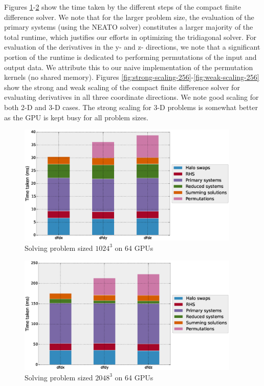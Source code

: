 \documentclass{elsarticle}
\begin{document}
Figures \ref{fig:compact-profiling-1024-64}-\ref{fig:compact-profiling-2048-64}
show the time taken by the different steps of
the compact finite difference solver.
We note that for the larger problem size,
the evaluation of the primary systems (using the NEATO solver)
constitutes a larger majority of the total runtime,
which justifies our efforts in optimizing the tridiagonal solver.
For evaluation of the derivatives in the y- and z- directions,
we note that a significant portion of the runtime is dedicated
to performing permutations of the input and output data.
We attribute this to our naive implementation of the
permutation kernels (no shared memory).
Figures \ref{fig:strong-scaling-256}-\ref{fig:weak-scaling-256}
show the strong and weak scaling of the compact finite difference solver
for evaluating derivatives in all three coordinate directions.
We note good scaling for both 2-D and 3-D cases.
The strong scaling for 3-D problems is somewhat better
as the GPU is kept busy for all problem sizes.

\begin{figure}
\begin{center}
\includegraphics[width=300pt]{fig/profiling-1024-64.eps}
\caption{Solving problem sized $1024^3$ on 64 GPUs}
\label{fig:compact-profiling-1024-64}
\end{center}
\end{figure}

\begin{figure}
\begin{center}
\includegraphics[width=300pt]{fig/profiling-2048-64.eps}
\caption{Solving problem sized $2048^3$ on 64 GPUs}
\label{fig:compact-profiling-2048-64}
\end{center}
\end{figure}
\end{document}
